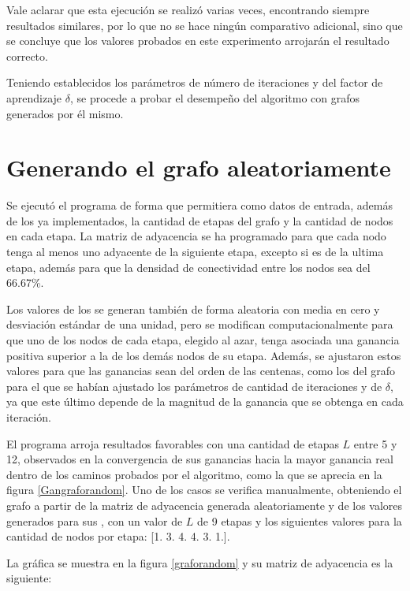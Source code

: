 Vale aclarar que esta ejecución se realizó varias veces, encontrando siempre resultados similares, por lo que no se hace ningún comparativo adicional, sino que  se concluye que los valores probados en este experimento arrojarán el resultado correcto.

Teniendo establecidos los parámetros de número de iteraciones y del factor de aprendizaje $\delta$, se procede a probar el desempeño del algoritmo con grafos generados por él mismo.

\section{Generando el grafo aleatoriamente}

Se ejecutó el programa de forma que permitiera como datos de entrada, además de los ya implementados, la cantidad de etapas del grafo y la cantidad de nodos en cada etapa. La matriz de adyacencia se ha programado para que cada nodo tenga al menos uno adyacente de la siguiente etapa, excepto si es de la ultima etapa, además para que la densidad de conectividad entre los nodos sea del 66.67\%. 

Los valores de los  se generan también de forma aleatoria con media en cero y desviación estándar de una unidad, pero se modifican computacionalmente para que uno de los nodos de cada etapa, elegido al azar, tenga asociada una ganancia positiva superior a la de los demás nodos de su etapa. Además, se ajustaron estos valores para que las ganancias sean del orden de las centenas, como los del grafo para el que se habían ajustado los parámetros de cantidad de iteraciones y de $\delta$, ya que este último depende de la magnitud de la ganancia que se obtenga en cada iteración.

El programa arroja resultados favorables con una cantidad de etapas $L$ entre 5 y 12, observados en la convergencia de sus ganancias hacia la mayor ganancia real dentro de los caminos probados por el algoritmo, como la que se aprecia en la figura \ref{Gangraforandom}. Uno de los casos se verifica manualmente, obteniendo el grafo a partir de la matriz de adyacencia generada aleatoriamente y de los valores generados para sus , con un valor de $L$ de 9 etapas y los siguientes valores para la cantidad de nodos por etapa: [1. 3. 4. 4. 3. 1.].

La gráfica se muestra en la figura \ref{graforandom} y su matriz de adyacencia es la siguiente:

